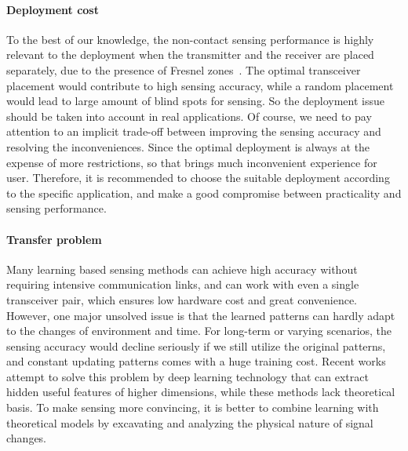 \paragraph*{Deployment cost} To the best of our knowledge, the non-contact sensing performance is highly relevant to the deployment when
the transmitter and the receiver are placed separately, due to the presence of Fresnel zones~\cite{wang2016human}. The optimal transceiver
placement would contribute to high sensing accuracy, while a random placement would lead to large amount of blind spots for sensing. So
the deployment issue should be taken into account in real applications. Of course, we need to pay attention to an implicit trade-off
between improving the sensing accuracy and resolving the inconveniences. Since the optimal deployment is always at the expense of more
restrictions, so that brings much inconvenient experience for user. Therefore, it is recommended to choose the suitable deployment
according to the specific application, and make a good compromise between practicality and sensing performance.

\paragraph*{Transfer problem} Many learning based sensing methods can achieve high accuracy without requiring intensive communication
links, and can work with even a single transceiver pair, which ensures low hardware cost and great convenience. However, one major unsolved
issue is that the learned patterns can hardly adapt to the changes of environment and time. For long-term or varying scenarios, the sensing
accuracy would decline seriously if we still utilize the original patterns, and constant updating patterns comes with a huge training cost.
Recent works attempt to solve this problem by deep learning technology that can extract hidden useful features of higher dimensions, while
these methods lack theoretical basis. To make sensing more convincing, it is better to combine learning with theoretical models by
excavating and analyzing the physical nature of signal changes.

